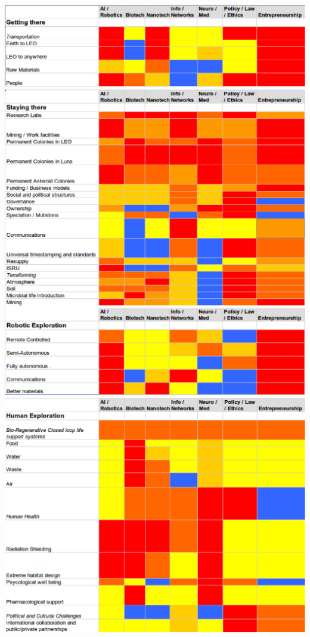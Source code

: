 \documentclass[letter,11pt]{article}
\begin{document}
\includegraphics[width=\textwidth]{hm_gt.eps}
\includegraphics[width=\textwidth]{hm_st.eps}
\includegraphics[width=\textwidth]{hm_re.eps}
\includegraphics[width=\textwidth]{hm_he.eps}
\end{document}

